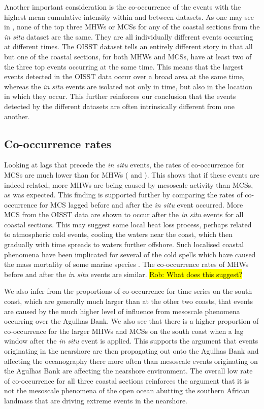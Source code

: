 \documentclass[a4paper,10pt,review]{elsarticle}
\begin{document}
Another important consideration is the co-occurrence of the events with the highest mean cumulative intensity within and between datasets. As one may see in , none of the top three MHWs or MCSs for any of the coastal sections from the \emph{in situ} dataset are the same. They are all individually different events occurring at different times. The OISST dataset tells an entirely different story in that all but one of the coastal sections, for both MHWs and MCSs, have at least two of the three top events occurring at the same time. This means that the largest events detected in the OISST data occur over a broad area at the same time, whereas the \emph{in situ} events are isolated not only in time, but also in the location in which they occur. This further reinforces our conclusion that the events detected by the different datasets are often intrinsically different from one another.

\subsection{Co-occurrence rates}
Looking at lags that precede the \emph{in situ} events, the rates of co-occurrence for MCSs are much lower than for MHWs ( and ). This shows that if these events are indeed related, more MHWs are being caused by mesoscale activity than MCSs, as was expected. This finding is supported further by comparing the rates of co-occurrence for MCS lagged before and after the \emph{in situ} event occurred. More MCS from the OISST data are shown to occur after the \emph{in situ} events for all coastal sections. This may suggest some local heat loss process, perhaps related to atmospheric cold events, cooling the waters near the coast, which then gradually with time spreads to waters further offshore. Such localised coastal phenomena have been implicated for several of the cold spells which have caused the mass mortality of some marine species \citep[e.g.][]{Gunter1941, Firth2011}. The co-occurrence rates of MHWs before and after the \emph{in situ} events are similar. \hl{Rob: What does this suggest?}

We also infer from the proportions of co-occurrence for time series on the south coast, which are generally much larger than at the other two coasts, that events are caused by the much higher level of influence from mesoscale phenomena occurring over the Agulhas Bank. We also see that there is a higher proportion of co-occurrence for the larger MHWs and MCSs on the south coast when a lag window after the \emph{in situ} event is applied. This supports the argument that events originating in the nearshore are then propagating out onto the Agulhas Bank and affecting the oceanography there more often than mesoscale events originating on the Agulhas Bank are affecting the nearshore environment. The overall low rate of co-occurrence for all three coastal sections reinforces the argument that it is not the mesoscale phenomena of the open ocean abutting the southern African landmass that are driving extreme events in the nearshore.
\end{document}

